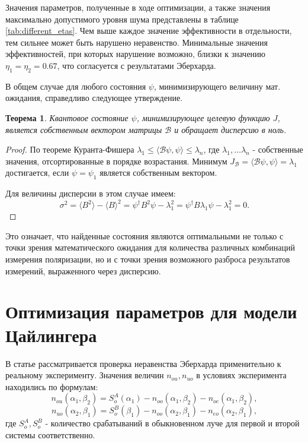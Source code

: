 \documentclass[%
master,         %
subf,           %
href,           %
,times         %
]{disser}
\numberwithin{equation}{section}
\numberwithin{figure}{section}
\newtheorem{theorem}{Теорема}[section]
\begin{document}
\endgroup

Значения параметров, полученные в ходе оптимизации, а также значения максимально допустимого уровня шума представлены в таблице \ref{tab:different_etas}. Чем выше каждое значение эффективности в отдельности, тем сильнее может быть нарушено неравенство. Минимальные значения эффективностей, при которых нарушение возможно, близки к значению $\eta_1 = \eta_2 = 0.67$, что согласуется с результатами Эберхарда.


В общем случае для любого состояния $\psi$, минимизирующего величину мат. ожидания, справедливо следующее утверждение.

\begin{theorem}
Квантовое состояние $\psi$, минимизирующее целевую функцию $J$, является собственным вектором матрицы $\mathcal{B}$ и обращает дисперсию в ноль.
\end{theorem}
\begin{proof}
По теореме Куранта-Фишера $\lambda_1 \leq \langle\mathcal{B}\psi, \psi\rangle \leq \lambda_n$, где $\lambda_1, \ldots \lambda_n$ - собственные значения, отсортированные в порядке возрастания. Минимум $J_\mathcal{B} = \langle\mathcal{B}\psi, \psi\rangle = \lambda_1$ достигается, если $\psi = \psi_1$ является собственным вектором. 

Для величины дисперсии в этом случае имеем:
\[\sigma^2 = \langle B^2\rangle - \langle B\rangle^2 = \psi^\dagger B^2 \psi - \lambda_1^2 = \psi^\dagger B \lambda_1  \psi - \lambda_1^2 = 0.
\]
\end{proof}

Это означает, что найденные состояния являются оптимальными не только с точки зрения математического ожидания для количества различных комбинаций измерения поляризации, но и с точки зрения возможного разброса результатов измерений, выраженного через дисперсию.

\section{Оптимизация параметров для модели Цайлингера}
В статье \cite{Zeilinger} рассматривается проверка неравенства Эберхарда применительно к реальному эксперименту. Значения величин $n_{ou}, n_{uo}$ в условиях эксперимента находились по формулам:
\[
n_{ou}(\alpha_1, \beta_2) = S_o^A(\alpha_1) - n_{oo}(\alpha_1, \beta_2) - n_{oe}(\alpha_1, \beta_2),
\]
\[
n_{uo}(\alpha_2, \beta_1) = S_o^B(\beta_1) - n_{oo}(\alpha_2, \beta_1) - n_{eo}(\alpha_2, \beta_1),
\]
где $S_o^A, S_o^B$ - количество срабатываний в обыкновенном луче для первой и второй системы соответственно.
\end{document}
